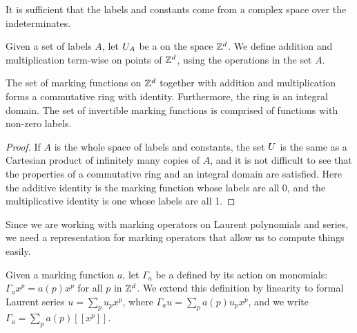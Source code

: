 It is sufficient that the labels and constants come from a complex space over the indeterminates.

\begin{defn} Given a set of labels $A$, let $U_A$ be a  on the space $\mathbb{Z}^d$. We define addition and multiplication term-wise on points of $\mathbb{Z}^d$, using the operations in the set $A$.
\end{defn}

\begin{prop} The set of marking functions on $\mathbb{Z}^d$ together with addition and multiplication forms a commutative ring with identity. Furthermore, the ring is an integral domain. The set of invertible marking functions is comprised of functions with non-zero labels.
\end{prop}
\begin{proof} If $A$ is the whole space of labels and constants, the set $U$ is the same as a Cartesian product of infinitely many copies of $A$, and it is not difficult to see that the properties of a commutative ring and an integral domain are satisfied. Here the additive identity is the marking function whose labels are all 0, and the multiplicative identity is one whose labels are all 1.
\end{proof}

Since we are working with marking operators on Laurent polynomials and series, we need a representation for marking operators that allow us to compute things easily.

\begin{defn} Given a marking function $a$, let $\Gamma_a$ be a  defined by its action on monomials: $\Gamma_a x^p = a(p) x^p$ for all $p$ in $\mathbb{Z}^d$.  We extend this definition by linearity to formal Laurent series $u = \sum_p u_px^p$, where $\Gamma_a u = \sum_p a(p)u_px^p$, and we write $\Gamma_a = \sum_p a(p)[[x^p]]$.
\end{defn}

